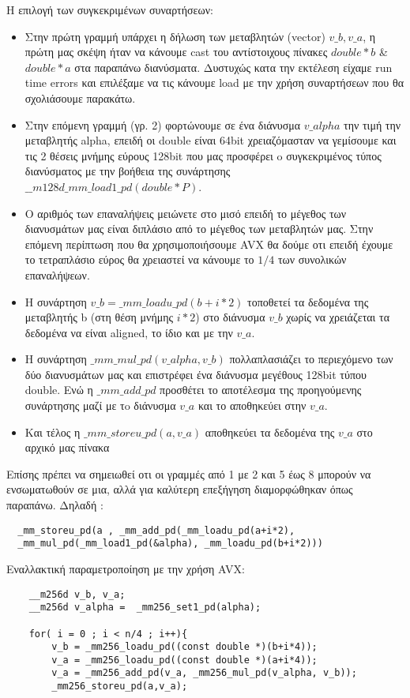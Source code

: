 \documentclass[greek,booktabs,8pt,flagBlueCMYK]{report}
\begin{document}
Η επιλογή των συγκεκριμένων συναρτήσεων:
\begin{itemize}
  \item Στην πρώτη γραμμή υπάρχει η δήλωση των μεταβλητών (vector) $v\_b, v\_a$, η πρώτη μας σκέψη ήταν να κάνουμε cast του αντίστοιχους πίνακες $double * b$ & $double * a$ στα παραπάνω διανύσματα. Δυστυχώς κατα την εκτέλεση είχαμε run time errors και επιλέξαμε να τις κάνουμε load με την χρήση συναρτήσεων που θα σχολιάσουμε παρακάτω.
  \item Στην επόμενη γραμμή (γρ. 2) φορτώνουμε σε ένα διάνυσμα $v\_alpha$ την τιμή την μεταβλητής alpha, επειδή οι double είναι 64bit χρειαζόμασταν να γεμίσουμε και τις 2 θέσεις μνήμης εύρους 128bit που μας προσφέρει o συγκεκριμένος τύπος διανύσματος με την βοήθεια της συνάρτησης $\_\_m128d \_mm\_load1\_pd (double * P) $.
  \item Ο αριθμός των επαναλήψεις μειώνετε στο μισό επειδή το μέγεθος των διανυσμάτων μας είναι διπλάσιο από το μέγεθος των μεταβλητών μας. Στην επόμενη περίπτωση που θα χρησιμοποιήσουμε AVX θα δούμε οτι επειδή έχουμε το τετραπλάσιο εύρος θα χρειαστεί να κάνουμε το $1/4$ των συνολικών επαναλήψεων.
  \item Η συνάρτηση $v\_b =  \_mm\_loadu\_pd(b+i*2)$ τοποθετεί τα δεδομένα της μεταβλητής b (στη θέση μνήμης $i * 2$) στο διάνυσμα $v\_b$ χωρίς να χρειάζεται τα δεδομένα να είναι aligned, το ίδιο και με την $v\_a$.
  \item Η συνάρτηση $\_mm\_mul\_pd(v\_alpha, v\_b)$ πολλαπλασιάζει το περιεχόμενο των δύο διανυσμάτων μας και επιστρέφει ένα διάνυσμα μεγέθους 128bit τύπου double. Ενώ η $\_mm\_add\_pd$ προσθέτει το αποτέλεσμα της προηγούμενης συνάρτησης μαζί με τo διάνυσμα $v\_a$ και το αποθηκεύει στην $v\_a$.
  \item Και τέλος η $\_mm\_storeu\_pd(a,v\_a)$ αποθηκεύει τα δεδομένα της $v\_a$ στο αρχικό μας πίνακα
\end{itemize}

Επίσης πρέπει να σημειωθεί οτι οι γραμμές από 1 με 2 και 5 έως 8 μπορούν να ενσωματωθούν σε μια, αλλά για καλύτερη επεξήγηση διαμορφώθηκαν όπως παραπάνω. 
	Δηλαδή : 
	
\begin{lstlisting}
  _mm_storeu_pd(a , _mm_add_pd(_mm_loadu_pd(a+i*2), 
  _mm_mul_pd(_mm_load1_pd(&alpha), _mm_loadu_pd(b+i*2)))
\end{lstlisting}

Εναλλακτική  παραμετροποίηση με την χρήση AVX:

\begin{lstlisting}
	__m256d v_b, v_a; 
	__m256d v_alpha =  _mm256_set1_pd(alpha); 

	for( i = 0 ; i < n/4 ; i++){ 
		v_b = _mm256_loadu_pd((const double *)(b+i*4)); 
		v_a = _mm256_loadu_pd((const double *)(a+i*4)); 
		v_a = _mm256_add_pd(v_a, _mm256_mul_pd(v_alpha, v_b)); 
		_mm256_storeu_pd(a,v_a); 
\end{lstlisting}
\end{document}
